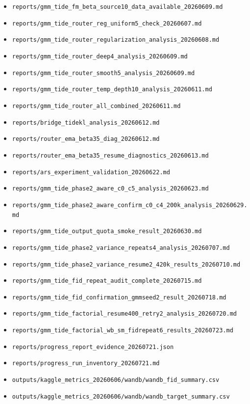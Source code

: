 \documentclass[11pt,a4paper]{article}
\newcommand{\run}[1]{{\small\nolinkurl{#1}}}
\begin{document}
\begin{itemize}
  \item \run{reports/gmm_tide_fm_beta_source10_data_available_20260609.md}
  \item \run{reports/gmm_tide_router_reg_uniform5_check_20260607.md}
  \item \run{reports/gmm_tide_router_regularization_analysis_20260608.md}
  \item \run{reports/gmm_tide_router_deep4_analysis_20260609.md}
  \item \run{reports/gmm_tide_router_smooth5_analysis_20260609.md}
  \item \run{reports/gmm_tide_router_temp_depth10_analysis_20260611.md}
  \item \run{reports/gmm_tide_router_all_combined_20260611.md}
  \item \run{reports/bridge_tidekl_analysis_20260612.md}
  \item \run{reports/router_ema_beta35_diag_20260612.md}
  \item \run{reports/router_ema_beta35_resume_diagnostics_20260613.md}
  \item \run{reports/ars_experiment_validation_20260622.md}
  \item \run{reports/gmm_tide_phase2_aware_c0_c5_analysis_20260623.md}
  \item \run{reports/gmm_tide_phase2_aware_confirm_c0_c4_200k_analysis_20260629.md}
  \item \run{reports/gmm_tide_output_quota_smoke_result_20260630.md}
  \item \run{reports/gmm_tide_phase2_variance_repeats4_analysis_20260707.md}
  \item \run{reports/gmm_tide_phase2_variance_resume2_420k_results_20260710.md}
  \item \run{reports/gmm_tide_fid_repeat_audit_complete_20260715.md}
  \item \run{reports/gmm_tide_fid_confirmation_gmmseed2_result_20260718.md}
  \item \run{reports/gmm_tide_factorial_resume400_retry2_analysis_20260720.md}
  \item \run{reports/gmm_tide_factorial_wb_sm_fidrepeat6_results_20260723.md}
  \item \run{reports/progress_report_evidence_20260721.json}
  \item \run{reports/progress_run_inventory_20260721.md}
  \item \run{outputs/kaggle_metrics_20260606/wandb/wandb_fid_summary.csv}
  \item \run{outputs/kaggle_metrics_20260606/wandb/wandb_target_summary.csv}
\end{itemize}
\end{document}
